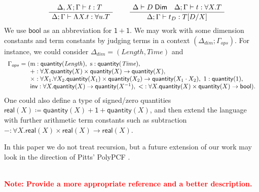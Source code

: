 \documentclass[a4paper,UKenglish]{lipics}
\newcommand\note[1]{{ \bf \textcolor{red} {\vspace{2mm}\; \\ Note: #1\\}}}
\newcommand{\msf}[1]{\mathsf{#1}} %
\newcommand{\unitTy}{\msf{1}}
\newcommand{\qnt}{\msf{quantity}}
\newcommand{\sreal}{\msf{real}}
\newcommand{\bool}{\msf{bool}}
\newcommand{\lengthDim}{\mathit{Length}}
\newcommand{\timeDim}{\mathit{Time}}
\newcommand{\Deltadim}{\ensuremath{\Delta_{dim}}}
\newcommand{\Gammaops}{\ensuremath{\Gamma_{ops}}}
\newcommand{\Dj}[2]{#1 \vdash #2 \; \msf{ Dim}}
\newcommand{\tj}[4]{#1;#2 \vdash #3 : #4}
\newcommand{\pack}[2]{\mathsf{pack}(#1,#2)}
\newcommand{\unpack}[4]{\mathsf{unpack}\,#1\,\mathsf{as}\,(#2,#3)\,\mathsf{in}\,#4}
\newcommand{\Dim}{D}
\newcommand{\Dvar}{X}
\begin{document}
\[\begin{array}{cc}
\hspace{5mm}
\AxiomC{$\tj{\Delta,\Dvar}\Gamma tT$ }
		\UnaryInfC{$\tj \Delta  \Gamma {\Lambda \Dvar.t} {\forall u.T}$}
		\DisplayProof

&\hspace{5mm}
\AxiomC{$\Dj\Delta \Dim \quad \tj \Delta \Gamma  t{\forall \Dvar.T}$}
	\UnaryInfC{$\tj \Delta  \Gamma {t_\Dim}{T[\Dim/\Dvar]}$}
	\DisplayProof
%
\end{array}\]
%
We use $\bool$ as an abbreviation for $\unitTy + \unitTy$. 
We may work with some dimension constants and term constants
by judging terms in a context $(\Deltadim;\Gammaops)$.
For instance, we could consider $\Deltadim = (\lengthDim, \timeDim)$ and 
\[\begin{array}{r@{}l}\Gammaops = (
&\mathrm{m}:\qnt(\lengthDim), 
\ \mathrm{s}:\qnt(\timeDim),
\\&+:\forall \Dvar. \qnt(\Dvar)\times  \qnt(\Dvar) \rightarrow \qnt(\Dvar), 
\\&\times :\forall \Dvar_1. \forall \Dvar_2. \qnt(\Dvar_1)\times \qnt(\Dvar_2) \rightarrow \qnt(\Dvar_1 \cdot \Dvar_2), 
\ 1:\qnt(1), 
\\&\mathsf{inv}:\forall \Dvar.\qnt(\Dvar)\to \qnt (\Dvar^{-1}), 
\ {<}:\forall \Dvar.\qnt(\Dvar)\times \qnt(\Dvar)\to \bool)\text.
\end{array}\]
%
One could also define a type of signed/zero quantities $\sreal(\Dvar)\coloneqq \qnt(\Dvar)+\unitTy+\qnt(\Dvar)$, and then extend the language with further arithmetic term constants such as subtraction $-:\forall \Dvar.\sreal(\Dvar)\times \sreal(\Dvar)\to\sreal(\Dvar)$. 

In this paper we do not treat recursion, but a future extension of our work may look in the direction of Pitts' PolyPCF \cite{pitts2000parametric}.

\note{Provide a more appropriate reference and a better description.}
\end{document}

